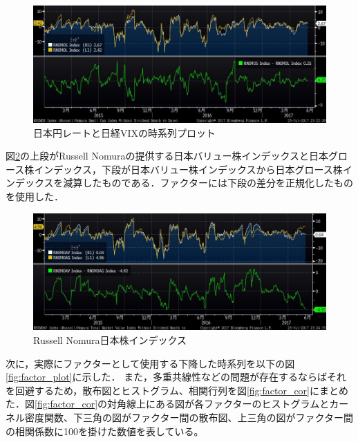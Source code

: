 \documentclass[11pt]{jreport}
\begin{document}
\begin{figure}[H]
	\begin{center}
		\includegraphics[width=15cm]{./fig/Size.jpg}
		\caption{日本円レートと日経VIXの時系列プロット}
		\label{fig:Size}
	\end{center}
\end{figure}
図\ref{fig:Value}の上段がRussell Nomuraの提供する日本バリュー株インデックスと日本グロース株インデックス，下段が日本バリュー株インデックスから日本グロース株インデックスを減算したものである．ファクターには下段の差分を正規化したものを使用した．
\begin{figure}[H]
	\begin{center}
		\includegraphics[width=15cm]{./fig/Value.jpg}
		\caption{Russell Nomura日本株インデックス}
		\label{fig:Value}
	\end{center}
\end{figure}

次に，実際にファクターとして使用する下降した時系列を以下の図\ref{fig:factor_plot}に示した．
また，多重共線性などの問題が存在するならばそれを回避するため，散布図とヒストグラム、相関行列を図\ref{fig:factor_cor}にまとめた．図\ref{fig:factor_cor}の対角線上にある図が各ファクターのヒストグラムとカーネル密度関数、下三角の図がファクター間の散布図、上三角の図がファクター間の相関係数に100を掛けた数値を表している。
\end{document}
